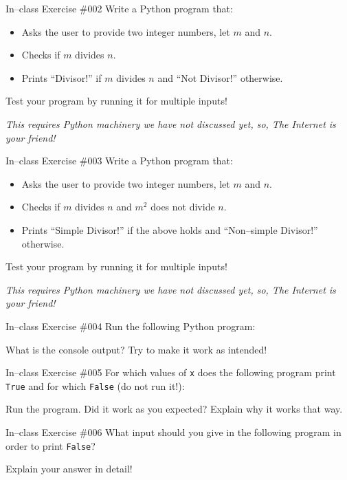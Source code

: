 \documentclass[aspectratio=169, 12pt, xcolor=table]{beamer}
\begin{document}
	\begin{frame}{In--class Exercise \#002}
		Write a Python program that:
		\begin{itemize}
			\item Asks the user to provide two integer numbers, let $m$ and $n$.
			\item Checks if $m$ divides $n$.
			\item Prints ``Divisor!'' if $m$ divides $n$ and ``Not Divisor!'' otherwise.
		\end{itemize}
		Test your program by running it for multiple inputs!
		
		\textit{This requires Python machinery we have not discussed yet, so, The Internet is your friend!}
	\end{frame}

	\begin{frame}{In--class Exercise \#003}
		Write a Python program that:
		\begin{itemize}
			\item Asks the user to provide two integer numbers, let $m$ and $n$.
			\item Checks if $m$ divides $n$ and $m^2$ does not divide $n$.
			\item Prints ``Simple Divisor!'' if the above holds and ``Non--simple Divisor!'' otherwise.
		\end{itemize}
		Test your program by running it for multiple inputs!
		
		\textit{This requires Python machinery we have not discussed yet, so, The Internet is your friend!}
	\end{frame}

	\begin{frame}{In--class Exercise \#004}
		Run the following Python program:
		
		What is the console output? Try to make it work as intended!
	\end{frame}

	\begin{frame}{In--class Exercise \#005}
		For which values of \texttt{x} does the following program print \texttt{True} and for which \texttt{False} (do not run it!):
		
		Run the program. Did it work as you expected? Explain why it works that way.
	\end{frame}

	\begin{frame}{In--class Exercise \#006}
		What input should you give in the following program in order to print \texttt{False}?
		
		Explain your answer in detail!
	\end{frame}
\end{document}
